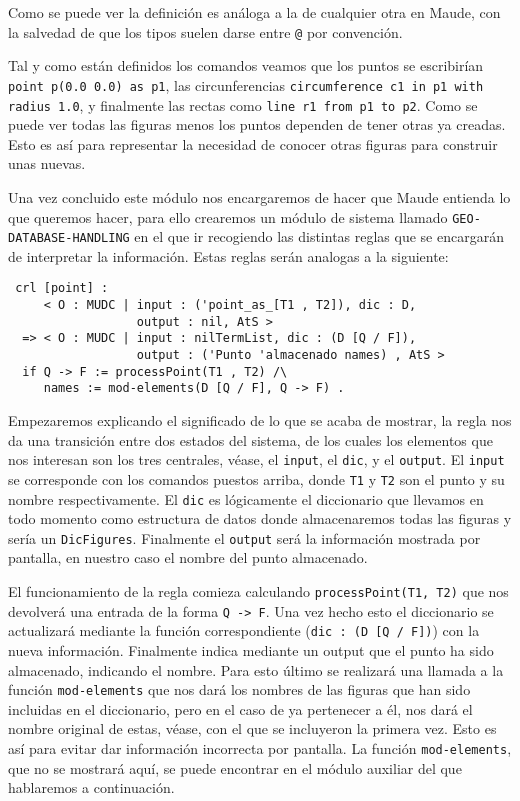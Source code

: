 Como se puede ver la definición es análoga a la de cualquier otra en Maude, con la salvedad de que los tipos suelen darse entre \verb"@" por convención. \par 

Tal y como están definidos los comandos veamos que los puntos se escribirían \verb"point p(0.0 0.0) as p1", las circunferencias \texttt{circumference c1 in p1 with radius 1.0}, y finalmente las rectas como \verb"line r1 from p1 to p2". Como se puede ver todas las figuras menos los puntos dependen de tener otras ya creadas. Esto es así para representar la necesidad de conocer otras figuras para construir unas nuevas.\par

Una vez concluido este módulo nos encargaremos de hacer que Maude entienda lo que queremos hacer, para ello crearemos un módulo de sistema llamado \verb"GEO-DATABASE-HANDLING" en el que ir recogiendo las distintas reglas que se encargarán de interpretar la información. Estas reglas serán analogas a la siguiente:\par

{\codesize
\begin{verbatim}
 crl [point] :
     < O : MUDC | input : ('point_as_[T1 , T2]), dic : D,
                  output : nil, AtS >
  => < O : MUDC | input : nilTermList, dic : (D [Q / F]),
                  output : ('Punto 'almacenado names) , AtS >
  if Q -> F := processPoint(T1 , T2) /\
     names := mod-elements(D [Q / F], Q -> F) .
\end{verbatim}
}
Empezaremos explicando el significado de lo que se acaba de mostrar, la regla nos da una transición entre dos estados del sistema, de los cuales los elementos que nos interesan son los tres centrales, véase, el \texttt{input}, el \texttt{dic}, y el \texttt{output}. El \texttt{input} se corresponde con los comandos puestos arriba, donde \texttt{T1} y \texttt{T2} son el punto y su nombre respectivamente. El \texttt{dic} es lógicamente el diccionario que llevamos en todo momento como estructura de datos donde almacenaremos todas las figuras y sería un \verb"DicFigures". Finalmente el \texttt{output} será la información mostrada por pantalla, en nuestro caso el nombre del punto almacenado. \par

El funcionamiento de la regla comieza calculando \texttt{processPoint(T1, T2)} que nos devolverá una entrada de la forma \texttt{Q -> F}. Una vez hecho esto el diccionario se actualizará mediante la función correspondiente (\verb"dic : (D [Q / F])") con la nueva información. Finalmente indica mediante un output que el punto ha sido almacenado, indicando el nombre. Para esto último se realizará una llamada a la función \texttt{mod-elements} que nos dará los nombres de las figuras que han sido incluidas en el diccionario, pero en el caso de ya pertenecer a él, nos dará el nombre original de estas, véase, con el que se incluyeron la primera vez. Esto es así para evitar dar información incorrecta por pantalla. La función \texttt{mod-elements}, que no se mostrará aquí, se puede encontrar en el módulo auxiliar del que hablaremos a continuación.\par

